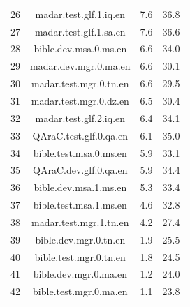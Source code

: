 \begin{table}[htbp]
\begin{tabular}{l@{\hspace{3pt}}c@{\hspace{3pt}}c@{\hspace{3pt}}c}
26 & madar.test.glf.1.iq.en & 7.6 & 36.8 \\
27 & madar.test.glf.1.sa.en & 7.6 & 36.6 \\
28 & bible.dev.msa.0.ms.en & 6.6 & 34.0 \\
29 & madar.dev.mgr.0.ma.en & 6.6 & 30.1 \\
30 & madar.test.mgr.0.tn.en & 6.6 & 29.5 \\
31 & madar.test.mgr.0.dz.en & 6.5 & 30.4 \\
32 & madar.test.glf.2.iq.en & 6.4 & 34.1 \\
33 & QAraC.test.glf.0.qa.en & 6.1 & 35.0 \\
34 & bible.test.msa.0.ms.en & 5.9 & 33.1 \\
35 & QAraC.dev.glf.0.qa.en & 5.9 & 34.4 \\
36 & bible.dev.msa.1.ms.en & 5.3 & 33.4 \\
37 & bible.test.msa.1.ms.en & 4.6 & 32.8 \\
38 & madar.test.mgr.1.tn.en & 4.2 & 27.4 \\
39 & bible.dev.mgr.0.tn.en & 1.9 & 25.5 \\
40 & bible.test.mgr.0.tn.en & 1.8 & 24.5 \\
41 & bible.dev.mgr.0.ma.en & 1.2 & 24.0 \\
42 & bible.test.mgr.0.ma.en & 1.1 & 23.8 \\
\bottomrule
\end{tabular}
\end{table}
